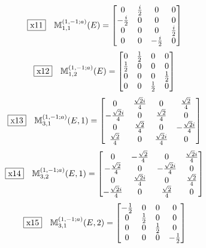 \documentclass[fleqn,10pt,landscape]{jsarticle}
\begin{document}
\begin{dmath*}
\fbox{x11}\quad \mathbb{M}_{1,1}^{(1,-1;a)}(E)=\begin{bmatrix} 0 & \frac{i}{2} & 0 & 0 \\ - \frac{i}{2} & 0 & 0 & 0 \\ 0 & 0 & 0 & \frac{i}{2} \\ 0 & 0 & - \frac{i}{2} & 0 \end{bmatrix}
\end{dmath*}
\begin{dmath*}
\fbox{x12}\quad \mathbb{M}_{1,2}^{(1,-1;a)}(E)=\begin{bmatrix} 0 & \frac{1}{2} & 0 & 0 \\ \frac{1}{2} & 0 & 0 & 0 \\ 0 & 0 & 0 & \frac{1}{2} \\ 0 & 0 & \frac{1}{2} & 0 \end{bmatrix}
\end{dmath*}
\begin{dmath*}
\fbox{x13}\quad \mathbb{M}_{3,1}^{(1,-1;a)}(E,1)=\begin{bmatrix} 0 & \frac{\sqrt{2} i}{4} & 0 & \frac{\sqrt{2}}{4} \\ - \frac{\sqrt{2} i}{4} & 0 & \frac{\sqrt{2}}{4} & 0 \\ 0 & \frac{\sqrt{2}}{4} & 0 & - \frac{\sqrt{2} i}{4} \\ \frac{\sqrt{2}}{4} & 0 & \frac{\sqrt{2} i}{4} & 0 \end{bmatrix}
\end{dmath*}
\begin{dmath*}
\fbox{x14}\quad \mathbb{M}_{3,2}^{(1,-1;a)}(E,1)=\begin{bmatrix} 0 & - \frac{\sqrt{2}}{4} & 0 & \frac{\sqrt{2} i}{4} \\ - \frac{\sqrt{2}}{4} & 0 & - \frac{\sqrt{2} i}{4} & 0 \\ 0 & \frac{\sqrt{2} i}{4} & 0 & \frac{\sqrt{2}}{4} \\ - \frac{\sqrt{2} i}{4} & 0 & \frac{\sqrt{2}}{4} & 0 \end{bmatrix}
\end{dmath*}
\begin{dmath*}
\fbox{x15}\quad \mathbb{M}_{3,1}^{(1,-1;a)}(E,2)=\begin{bmatrix} - \frac{1}{2} & 0 & 0 & 0 \\ 0 & \frac{1}{2} & 0 & 0 \\ 0 & 0 & \frac{1}{2} & 0 \\ 0 & 0 & 0 & - \frac{1}{2} \end{bmatrix}
\end{dmath*}
\end{document}
